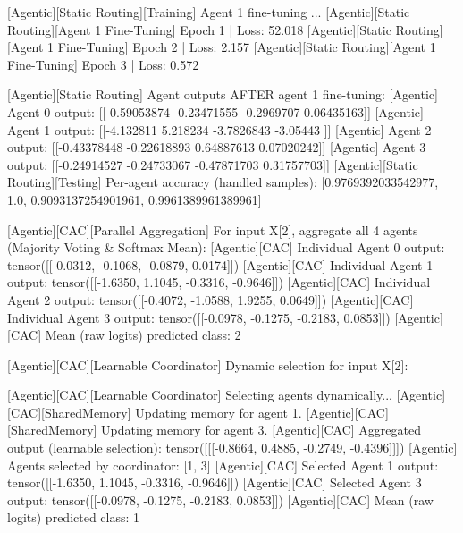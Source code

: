 [Agentic][Static Routing][Training] Agent 1 fine-tuning ...
[Agentic][Static Routing][Agent 1 Fine-Tuning] Epoch 1 | Loss: 52.018
[Agentic][Static Routing][Agent 1 Fine-Tuning] Epoch 2 | Loss: 2.157
[Agentic][Static Routing][Agent 1 Fine-Tuning] Epoch 3 | Loss: 0.572

[Agentic][Static Routing] Agent outputs AFTER agent 1 fine-tuning:
[Agentic] Agent 0 output: [[ 0.59053874 -0.23471555 -0.2969707   0.06435163]]
[Agentic] Agent 1 output: [[-4.132811   5.218234  -3.7826843 -3.05443  ]]
[Agentic] Agent 2 output: [[-0.43378448 -0.22618893  0.64887613  0.07020242]]
[Agentic] Agent 3 output: [[-0.24914527 -0.24733067 -0.47871703  0.31757703]]
[Agentic][Static Routing][Testing] Per-agent accuracy (handled samples): [0.9769392033542977, 1.0, 0.9093137254901961, 0.9961389961389961]

[Agentic][CAC][Parallel Aggregation] For input X[2], aggregate all 4 agents (Majority Voting & Softmax Mean):
[Agentic][CAC] Individual Agent 0 output: tensor([[-0.0312, -0.1068, -0.0879,  0.0174]])
[Agentic][CAC] Individual Agent 1 output: tensor([[-1.6350,  1.1045, -0.3316, -0.9646]])
[Agentic][CAC] Individual Agent 2 output: tensor([[-0.4072, -1.0588,  1.9255,  0.0649]])
[Agentic][CAC] Individual Agent 3 output: tensor([[-0.0978, -0.1275, -0.2183,  0.0853]])
[Agentic][CAC] Mean (raw logits) predicted class: 2

[Agentic][CAC][Learnable Coordinator] Dynamic selection for input X[2]:

[Agentic][CAC][Learnable Coordinator] Selecting agents dynamically...
[Agentic][CAC][SharedMemory] Updating memory for agent 1.
[Agentic][CAC][SharedMemory] Updating memory for agent 3.
[Agentic][CAC] Aggregated output (learnable selection): tensor([[[-0.8664,  0.4885, -0.2749, -0.4396]]])
[Agentic] Agents selected by coordinator: [1, 3]
[Agentic][CAC] Selected Agent 1 output: tensor([[-1.6350,  1.1045, -0.3316, -0.9646]])
[Agentic][CAC] Selected Agent 3 output: tensor([[-0.0978, -0.1275, -0.2183,  0.0853]])
[Agentic][CAC] Mean (raw logits) predicted class: 1
